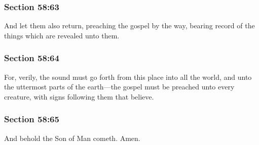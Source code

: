 	\subsubsection{Section 58:63} %
		\label{DC58-63}

		And let them also return, preaching the gospel by the way, bearing record of the things which are revealed unto them.


	\subsubsection{Section 58:64} %
		\label{DC58-64}

		For, verily, the sound must go forth from this place into all the world, and unto the uttermost parts of the earth---the gospel must be preached unto every creature, with signs following them that believe.


	\subsubsection{Section 58:65} %
		\label{DC58-65}

		And behold the Son of Man cometh. Amen.

